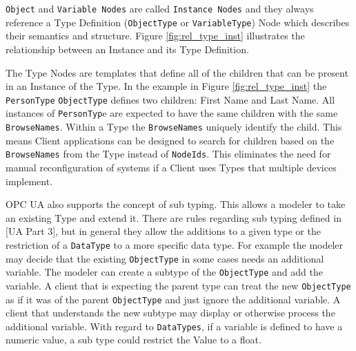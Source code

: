 \documentclass{mtconnect}	%
\begin{document}
\texttt{Object} and \texttt{Variable Nodes} are called \texttt{Instance Nodes} and they always reference a Type Definition (\texttt{ObjectType} or \texttt{VariableType}) Node which describes their semantics and structure. Figure \ref{fig:rel_type_inst} illustrates the relationship between an Instance and its Type Definition.

The Type Nodes are templates that define all of the children that can be present in an Instance of the Type. In the example in Figure \ref{fig:rel_type_inst} the \texttt{PersonType} \texttt{ObjectType} defines two children: First Name and Last Name. All instances of \texttt{PersonTyp}e are expected to have the same children with the same \texttt{BrowseNames}. Within a Type the \texttt{BrowseNames} uniquely identify the child. This means Client applications can be designed to search for children based on the \texttt{BrowseNames} from the Type instead of \texttt{NodeIds}. This eliminates the need for manual reconfiguration of systems if a Client uses Types that multiple devices implement.

OPC UA also supports the concept of sub typing. This allows a modeler to take an existing Type and extend it. There are rules regarding sub typing defined in [UA Part 3], but in general they allow the additions to a given type or the restriction of a \texttt{DataType} to a more specific data type. For example the modeler may decide that the existing \texttt{ObjectType} in some cases needs an additional variable. The modeler can create a subtype of the \texttt{ObjectType} and add the variable. A client that is expecting the parent type can treat the new \texttt{ObjectType} as if it was of the parent \texttt{ObjectType} and just ignore the additional variable. A client that understands the new subtype may display or otherwise process the additional variable. With regard to \texttt{DataTypes}, if a variable is defined to have a numeric value, a sub type could restrict the Value to a float.
\end{document}

